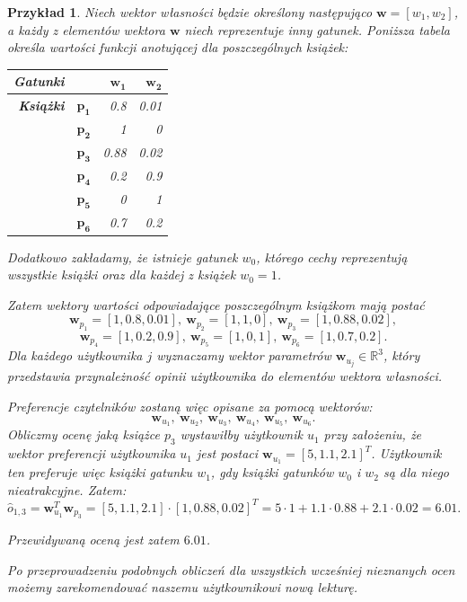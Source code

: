 \documentclass[12pt,a4paper]{report}
\newtheorem{przyklad}{Przykład}[chapter]
\newcommand{\setR}{\mathbb{R}}
\begin{document}
\begin{przyklad}
Niech wektor własności będzie określony następująco $\mathbf{w} = [w_1, w_2]$, a każdy z elementów wektora $\mathbf{w}$ niech reprezentuje inny gatunek. Poniższa tabela określa wartości funkcji anotującej dla poszczególnych książek:
\begin{center}
\begin{tabular}{|r|r|r|r|} \hline
\textbf{Gatunki} & & $\mathbf{w_1}$ & $\mathbf{w_2}$  \\
\hline
\hline
\textbf{Książki} &$\mathbf{p_1}$ & 0.8 & 0.01 \\
\hline
&$\mathbf{p_2}$ & 1 & 0  \\
\hline
&$\mathbf{p_3}$ & 0.88 & 0.02 \\
\hline
&$\mathbf{p_4}$ & 0.2 & 0.9 \\
\hline
&$\mathbf{p_5}$ & 0 & 1 \\
\hline
&$\mathbf{p_6}$ & 0.7 & 0.2 \\
\hline
\end{tabular}
\end{center}
Dodatkowo zakładamy, że istnieje gatunek $w_0$, którego cechy reprezentują wszystkie książki oraz dla każdej z książek $w_0=1$.

Zatem wektory wartości odpowiadające poszczególnym książkom mają postać
$$
\mathbf{w}_{p_1} = [1, 0.8, 0.01], \: \mathbf{w}_{p_2} = [1, 1, 0], \: \mathbf{w}_{p_3} = [1, 0.88, 0.02],
$$
$$
\mathbf{w}_{p_4} = [1, 0.2, 0.9], \: \mathbf{w}_{p_5} = [1, 0, 1], \: \mathbf{w}_{p_6} = [1, 0.7, 0.2].
$$
Dla każdego użytkownika $j$ wyznaczamy wektor parametrów $\mathbf{w}_{u_j} \in \setR^3$, który przedstawia przynależność opinii użytkownika do elementów wektora własności. 

Preferencje czytelników zostaną więc opisane za pomocą wektorów:
$$
\mathbf{w}_{u_1}, \: \mathbf{w}_{u_2}, \: \mathbf{w}_{u_3}, \: \mathbf{w}_{u_4}, \: \mathbf{w}_{u_5}, \: \mathbf{w}_{u_6}.
$$
Obliczmy ocenę jaką książce $p_3$ wystawiłby użytkownik $u_1$ przy założeniu, że wektor preferencji użytkownika $u_1$ jest postaci $\mathbf{w}_{u_1}= [5,1.1,2.1]^T$. Użytkownik ten preferuje więc książki gatunku $w_1$, gdy książki gatunków $w_0$ i $w_2$ są dla niego nieatrakcyjne.
Zatem:
$$
\widehat{o}_{1,3} = \mathbf{w}_{u_1}^T \mathbf{w}_{p_3} = [5,1.1,2.1] \cdot [1, 0.88, 0.02] ^ T = 5 \cdot 1 + 1.1 \cdot 0.88 + 2.1 \cdot 0.02 = 6.01.
$$

Przewidywaną oceną jest zatem $6.01$. 

Po przeprowadzeniu podobnych obliczeń dla wszystkich wcześniej nieznanych ocen możemy zarekomendować naszemu użytkownikowi nową lekturę.
\end{przyklad}
\end{document}
